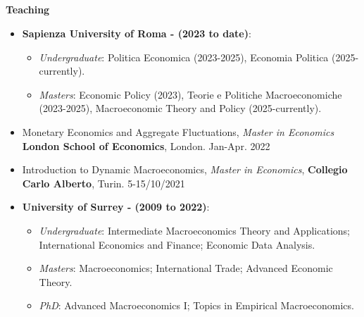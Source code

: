\documentclass[margin, 11pt]{res} %
\begin{document}
\begin{resume}







\section{}

\textbf{Teaching}

\begin{itemize}
    \item \textbf{Sapienza University of Roma - (2023 to date)}:
    \begin{itemize}
        \item \emph{Undergraduate}: Politica Economica (2023-2025), Economia Politica (2025-currently). 
        \item \emph{Masters}: Economic Policy (2023), Teorie e Politiche Macroeconomiche (2023-2025), Macroeconomic Theory and Policy (2025-currently).  
    \end{itemize}

    \item Monetary Economics and Aggregate Fluctuations, \emph{Master in Economics} \textbf{London School of Economics}, London. \hfill Jan-Apr. 2022 
    \item Introduction to Dynamic Macroeconomics, \emph{Master in Economics}, \textbf{Collegio Carlo Alberto}, Turin. \hfill 5-15/10/2021 
    \item \textbf{University of Surrey - (2009 to 2022)}:

\begin{itemize}
	\item \emph{Undergraduate}: Intermediate Macroeconomics Theory and Applications; International Economics and Finance; Economic Data Analysis. 
	\item \emph{Masters}: Macroeconomics; International Trade; Advanced Economic Theory. 
	\item \emph{PhD}: Advanced Macroeconomics I; Topics in Empirical Macroeconomics. 
\end{itemize}
\end{itemize}



\end{resume}
\end{document}
